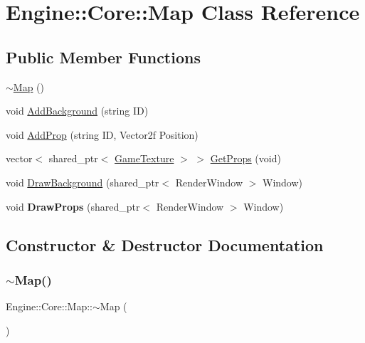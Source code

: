 \hypertarget{class_engine_1_1_core_1_1_map}{}\section{Engine\+:\+:Core\+:\+:Map Class Reference}
\label{class_engine_1_1_core_1_1_map}
\subsection*{Public Member Functions}
\begin{DoxyCompactItemize}
\item 
\hyperlink{class_engine_1_1_core_1_1_map_a211f38a71b97179bbbd153442225a273}{$\sim$\+Map} ()
\item 
void \hyperlink{class_engine_1_1_core_1_1_map_aa81a28822b49c3c7750f0444a189ed8c}{Add\+Background} (string ID)
\item 
void \hyperlink{class_engine_1_1_core_1_1_map_aad4517115b5d8713aed2f67338cd7259}{Add\+Prop} (string ID, Vector2f Position)
\item 
vector$<$ shared\+\_\+ptr$<$ \hyperlink{class_engine_1_1_core_1_1_game_texture}{Game\+Texture} $>$ $>$ \hyperlink{class_engine_1_1_core_1_1_map_afafd62cdfe87b27796d0900e76aa09ea}{Get\+Props} (void)
\item 
void \hyperlink{class_engine_1_1_core_1_1_map_aeb4eabaf8cbde4e584836daa646c0521}{Draw\+Background} (shared\+\_\+ptr$<$ Render\+Window $>$ Window)
\item 
\mbox{\label{class_engine_1_1_core_1_1_map_a2e6a7e15ecd79f449fe6326768069953}} 
void {\bfseries Draw\+Props} (shared\+\_\+ptr$<$ Render\+Window $>$ Window)
\end{DoxyCompactItemize}


\subsection{Constructor \& Destructor Documentation}
\mbox{\label{class_engine_1_1_core_1_1_map_a211f38a71b97179bbbd153442225a273}} 
\subsubsection{\texorpdfstring{$\sim$\+Map()}{~Map()}}
{\footnotesize\ttfamily Engine\+::\+Core\+::\+Map\+::$\sim$\+Map (\begin{DoxyParamCaption}{ }\end{DoxyParamCaption})}

